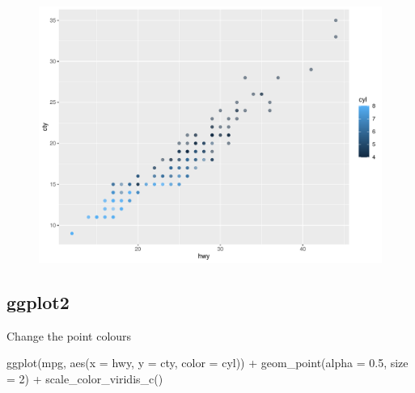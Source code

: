 \documentclass[
  letterpaper,
  DIV=11,
  numbers=noendperiod,
  landscape]{scrartcl}
\newenvironment{Shaded}{\begin{snugshade}}{\end{snugshade}}
\newcommand{\AttributeTok}[1]{\textcolor[rgb]{0.40,0.45,0.13}{#1}}
\newcommand{\DecValTok}[1]{\textcolor[rgb]{0.68,0.00,0.00}{#1}}
\newcommand{\FloatTok}[1]{\textcolor[rgb]{0.68,0.00,0.00}{#1}}
\newcommand{\FunctionTok}[1]{\textcolor[rgb]{0.28,0.35,0.67}{#1}}
\newcommand{\NormalTok}[1]{\textcolor[rgb]{0.00,0.23,0.31}{#1}}
\newcommand{\SpecialCharTok}[1]{\textcolor[rgb]{0.37,0.37,0.37}{#1}}
\begin{document}
\begin{figure}[H]

{\centering \includegraphics{RandRStudio_files/figure-pdf/unnamed-chunk-14-1.pdf}

}

\end{figure}

\hypertarget{ggplot2-4}{%
\subsection{ggplot2}\label{ggplot2-4}}

Change the point colours

\begin{Shaded}
\begin{Highlighting}[numbers=left,,]
\FunctionTok{ggplot}\NormalTok{(mpg, }\FunctionTok{aes}\NormalTok{(}\AttributeTok{x =}\NormalTok{ hwy, }\AttributeTok{y =}\NormalTok{ cty, }\AttributeTok{color =}\NormalTok{ cyl)) }\SpecialCharTok{+}
  \FunctionTok{geom\_point}\NormalTok{(}\AttributeTok{alpha =} \FloatTok{0.5}\NormalTok{, }\AttributeTok{size =} \DecValTok{2}\NormalTok{)  }\SpecialCharTok{+}
  \FunctionTok{scale\_color\_viridis\_c}\NormalTok{()}
\end{Highlighting}
\end{Shaded}
\end{document}
